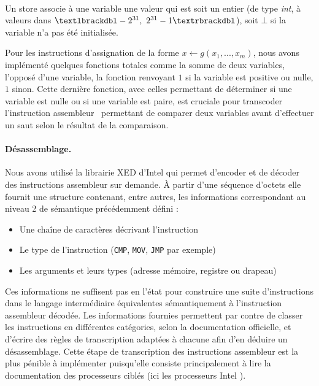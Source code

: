 ~\\
Un store associe à une variable une valeur qui est soit un entier (de type \emph{int}, à valeurs dans $\textlbrackdbl -2^{31},\   2^{31}-1\textrbrackdbl$), soit $\bot$ si la variable n'a pas été initialisée.

Pour les instructions d'assignation de la forme $x\leftarrow g(x_1, ..., x_m)$, nous avons implémenté quelques fonctions totales comme la somme de deux variables, l'opposé d'une variable, la fonction renvoyant $1$ si la variable est positive ou nulle, $1$ sinon.
Cette dernière fonction, avec celles permettant de déterminer si une variable est nulle ou si une variable est paire, est cruciale pour transcoder l'instruction assembleur \cmp\ permettant de comparer deux variables avant d'effectuer un saut selon le résultat de la comparaison.

\paragraph{Désassemblage.}
Nous avons utilisé la librairie XED d'Intel \cite{xed} qui permet d'encoder et de décoder des instructions assembleur sur demande.
À partir d'une séquence d'octets elle fournit une structure contenant, entre autres, les informations correspondant au niveau 2 de sémantique précédemment défini :
\begin{itemize}
 \item Une chaîne de caractères décrivant l'instruction
 \item Le type de l'instruction (\texttt{CMP}, \texttt{MOV}, \texttt{JMP} par exemple)
 \item Les arguments et leurs types (adresse mémoire, registre ou drapeau)
\end{itemize}
Ces informations ne suffisent pas en l'état pour construire une suite d'instructions dans le langage intermédiaire équivalentes sémantiquement à l'instruction assembleur décodée. 
Les informations fournies permettent par contre de classer les instructions en différentes catégories, selon la documentation officielle, et d'écrire des règles de transcription adaptées à chacune afin d'en déduire un désassemblage.
Cette étape de transcription des instructions assembleur est la plus pénible à implémenter puisqu'elle consiste principalement à lire la documentation des processeurs ciblés (ici les processeurs Intel \cite{intel_vol2}).

